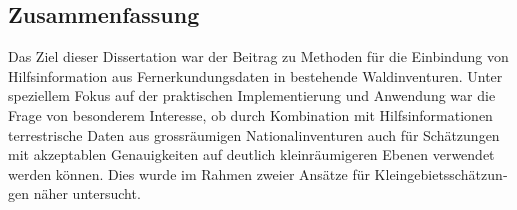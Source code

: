 \begin{otherlanguage}{ngerman}
\chapter*{Zusammenfassung}
\label{chap:Zusammenfassung}

Das Ziel dieser Dissertation war der Beitrag zu Methoden für die Einbindung von Hilfsinformation aus Fernerkundungsdaten in bestehende Waldinventuren. Unter speziellem Fokus auf der praktischen Implementierung und Anwendung war die Frage von besonderem Interesse, ob durch Kombination mit Hilfsinformationen terrestrische Daten aus grossräumigen Nationalinventuren auch für Schätzungen mit akzeptablen Genauigkeiten auf deutlich kleinräumigeren Ebenen verwendet werden können. Dies wurde im Rahmen zweier Ansätze für Kleingebietsschätzungen näher untersucht.\par


\end{otherlanguage}
